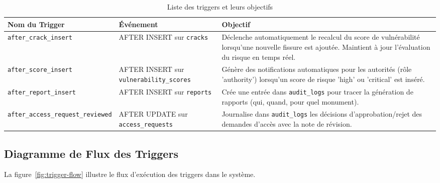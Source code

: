 \documentclass[12pt,a4paper]{article}
\begin{document}
\begin{table}[H]
\centering
\caption{Liste des triggers et leurs objectifs}
\label{tab:triggers}
\begin{tabular}{|p{3.5cm}|p{2.5cm}|p{6.5cm}|}
\hline
\textbf{Nom du Trigger} & \textbf{Événement} & \textbf{Objectif} \\
\hline
\texttt{after\_crack\_insert} & AFTER INSERT sur \texttt{cracks} & Déclenche automatiquement le recalcul du score de vulnérabilité lorsqu'une nouvelle fissure est ajoutée. Maintient à jour l'évaluation du risque en temps réel. \\
\hline
\texttt{after\_score\_insert} & AFTER INSERT sur \texttt{vulnerability\_scores} & Génère des notifications automatiques pour les autorités (rôle 'authority') lorsqu'un score de risque 'high' ou 'critical' est inséré. \\
\hline
\texttt{after\_report\_insert} & AFTER INSERT sur \texttt{reports} & Crée une entrée dans \texttt{audit\_logs} pour tracer la génération de rapports (qui, quand, pour quel monument). \\
\hline
\texttt{after\_access\_request\_reviewed} & AFTER UPDATE sur \texttt{access\_requests} & Journalise dans \texttt{audit\_logs} les décisions d'approbation/rejet des demandes d'accès avec la note de révision. \\
\hline
\end{tabular}
\end{table}

\subsection{Diagramme de Flux des Triggers}

La figure~\ref{fig:trigger-flow} illustre le flux d'exécution des triggers dans le système.
\end{document}

